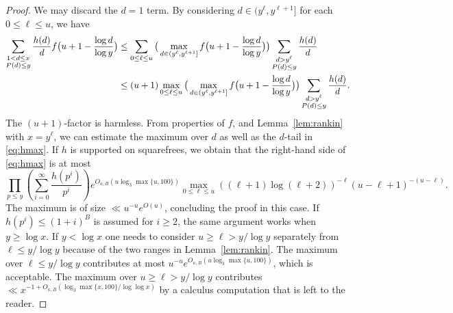 \documentclass[10pt,a4paper]{amsart}
\begin{document}
\begin{proof}
We may discard the $d=1$ term. By considering $d\in (y^{\ell},y^{\ell+1}]$ for each $0\le \ell \le u$, we have
\begin{align}
\notag\sum_{\substack{1<d\le x\\ P(d)\le y}} \frac{h(d)}{d}f\big( u+1 - \frac{\log d}{\log y}\big) &\le \sum_{0\le \ell \le u} \big(\max_{d \in (y^{\ell},y^{\ell+1}]} f\big( u+1 - \frac{\log d}{\log y}\big)\big) \sum_{\substack{d>y^{\ell}\\ P(d)\le y}} \frac{h(d)}{d}\\
\label{eq:hmax}&\le (u+1) \max_{0\le \ell \le u} \big(\max_{d \in (y^{\ell},y^{\ell+1}]} f\big( u+1 - \frac{\log d}{\log y}\big)\big) \sum_{\substack{d>y^{\ell}\\ P(d)\le y}} \frac{h(d)}{d}. 
\end{align}
The $(u+1)$-factor is harmless. From properties of $f$, and Lemma~\ref{lem:rankin} with $x=y^{\ell}$, we can estimate the maximum over $d$ as well as the $d$-tail in \eqref{eq:hmax}. If $h$ is supported on squarefrees, we obtain that the right-hand side of \eqref{eq:hmax} is at most
\[  \prod_{p\le y}(\sum_{i=0}^{\infty}\frac{h(p^i)}{p^i}) e^{O_{\kappa,B}(u\log_3 \max\{u,100\})} \max_{0\le \ell \le u}((\ell+1)\log(\ell+2))^{-\ell}(u-\ell+1)^{-(u-\ell)}. \]
The maximum is of size $\ll u^{-u} e^{O(u)}$, concluding the proof in this case. If $h(p^i)\le (1+i)^B$ is assumed for $i\ge 2$, the same argument works when $y\ge \log x$. If $y<\log x$ one needs to consider $u\ge \ell > y/\log y$ separately from $\ell \le y/\log y$ because of the two ranges in Lemma~\ref{lem:rankin}. The maximum over $\ell\le y/\log y$ contributes at most $u^{-u}e^{O_{\kappa,B}(u\log_3 \max\{u,100\})}$, which is acceptable. The maximum over $u\ge \ell >y/\log y$ contributes $\ll x^{-1+O_{\kappa,B}(\log_3 \max\{x,100\} / \log \log x)}$ by a calculus computation that is left to the reader.
\end{proof}
\end{document}

